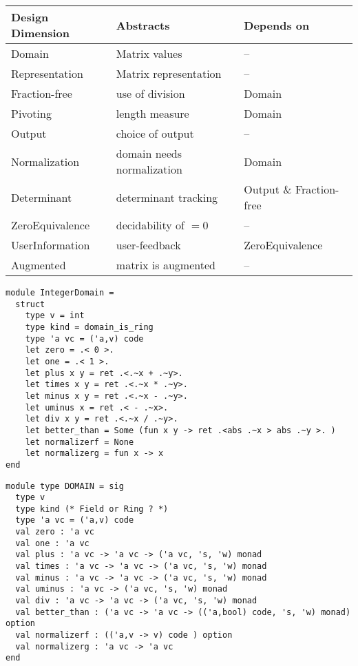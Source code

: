 \documentclass[landscape]{slides}
\begin{document}
\begin{slide}
    \hspace*{-2cm}
        \begin{tabular}{|l|l|l|} \hline
        Design Dimension & Abstracts & Depends on \\ \hline
        Domain & Matrix values & -- \\ \hline
        Representation & Matrix representation & -- \\ \hline
        Fraction-free & use of division & Domain \\ \hline
        Pivoting & length measure & Domain \\ \hline
        Output & choice of output & -- \\ \hline
        Normalization & domain needs normalization & Domain \\ \hline
        Determinant & determinant tracking & Output \& Fraction-free \\ \hline
        ZeroEquivalence & decidability of $=0$ & -- \\ \hline
        UserInformation & user-feedback & ZeroEquivalence\\ \hline
        Augmented & matrix is augmented & -- \\ \hline
    \end{tabular}
\end{slide}

\begin{slide}
\begin{verbatim}
module IntegerDomain = 
  struct
    type v = int
    type kind = domain_is_ring
    type 'a vc = ('a,v) code
    let zero = .< 0 >.  
    let one = .< 1 >. 
    let plus x y = ret .<.~x + .~y>. 
    let times x y = ret .<.~x * .~y>.
    let minus x y = ret .<.~x - .~y>.
    let uminus x = ret .< - .~x>.
    let div x y = ret .<.~x / .~y>. 
    let better_than = Some (fun x y -> ret .<abs .~x > abs .~y >. )
    let normalizerf = None 
    let normalizerg = fun x -> x
end
\end{verbatim}
\end{slide}

\begin{slide}
\begin{verbatim}
module type DOMAIN = sig
  type v
  type kind (* Field or Ring ? *)
  type 'a vc = ('a,v) code
  val zero : 'a vc
  val one : 'a vc
  val plus : 'a vc -> 'a vc -> ('a vc, 's, 'w) monad
  val times : 'a vc -> 'a vc -> ('a vc, 's, 'w) monad
  val minus : 'a vc -> 'a vc -> ('a vc, 's, 'w) monad
  val uminus : 'a vc -> ('a vc, 's, 'w) monad
  val div : 'a vc -> 'a vc -> ('a vc, 's, 'w) monad
  val better_than : ('a vc -> 'a vc -> (('a,bool) code, 's, 'w) monad) option
  val normalizerf : (('a,v -> v) code ) option
  val normalizerg : 'a vc -> 'a vc
end 
\end{verbatim}
\end{slide}
\end{document}
